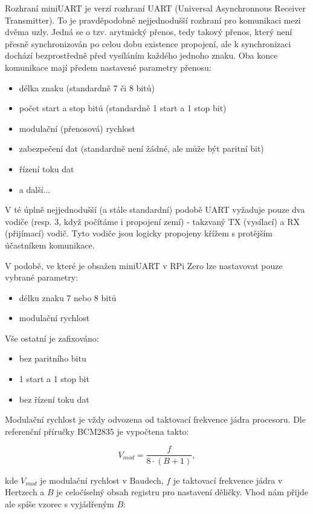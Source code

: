 \documentclass{article}
\begin{document}
Rozhraní miniUART je  verzí rozhraní UART (Universal Asynchronnous Receiver Transmitter). To je pravděpodobně nejjednodušší rozhraní pro komunikaci mezi dvěma uzly. Jedná se o tzv. arytmický přenos, tedy takový přenos, který není přesně synchronizován po celou dobu existence propojení, ale k synchronizaci dochází bezprostředně před vysíláním každého jednoho znaku. Oba konce komunikace mají předem nastavené parametry přenosu:
\begin{itemize}
	\item délka znaku (standardně 7 či 8 bitů)
	\item počet start a stop bitů (standardně 1 start a 1 stop bit)
	\item modulační (přenosová) rychlost
	\item zabezpečení dat (standardně není žádné, ale může být paritní bit)
	\item řízení toku dat
	\item a další...
\end{itemize}

V té úplně nejjednodušší (a stále standardní) podobě UART vyžaduje pouze dva vodiče (resp. 3, když počítáme i propojení zemí) - takzvaný TX (vysílací) a RX (přijímací) vodič. Tyto vodiče jsou logicky propojeny křížem s protějším účastníkem komunikace.

V podobě, ve které je obsažen miniUART v RPi Zero lze nastavovat pouze vybrané parametry:
\begin{itemize}
	\item délku znaku 7 nebo 8 bitů
	\item modulační rychlost
\end{itemize}
Vše ostatní je zafixováno:
\begin{itemize}
	\item bez paritního bitu
	\item 1 start a 1 stop bit
	\item bez řízení toku dat
\end{itemize}

Modulační rychlost je vždy odvozena od taktovací frekvence jádra procesoru. Dle referenční příručky BCM2835 je vypočtena takto:

\begin{equation}
V_{mod} = \frac{f}{8\cdot(B + 1)},
\end{equation}

kde $V_{mod}$ je modulační rychlost v Baudech, $f$ je taktovací frekvence jádra v Hertzech a $B$ je celočíselný obsah registru pro nastavení děličky. Vhod nám přijde ale spíše vzorec s vyjádřeným $B$:
\end{document}
